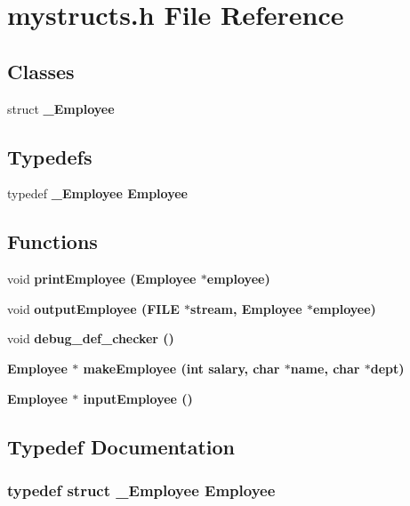 \section{mystructs.h File Reference}
\label{mystructs_8h}
\subsection*{Classes}
\begin{CompactItemize}
\item 
struct \bf{\_\-Employee}
\end{CompactItemize}
\subsection*{Typedefs}
\begin{CompactItemize}
\item 
typedef \bf{\_\-Employee} \bf{Employee}
\end{CompactItemize}
\subsection*{Functions}
\begin{CompactItemize}
\item 
void \bf{print\-Employee} (\bf{Employee} $\ast$employee)
\item 
void \bf{output\-Employee} (FILE $\ast$stream, \bf{Employee} $\ast$employee)
\item 
void \bf{debug\_\-def\_\-checker} ()
\item 
\bf{Employee} $\ast$ \bf{make\-Employee} (int salary, char $\ast$name, char $\ast$dept)
\item 
\bf{Employee} $\ast$ \bf{input\-Employee} ()
\end{CompactItemize}


\subsection{Typedef Documentation}
\subsubsection{\setlength{\rightskip}{0pt plus 5cm}typedef struct \bf{\_\-Employee} \bf{Employee}}\label{mystructs_8h_1564d0f1c02c3b00afc832a9fd8ddb53}




